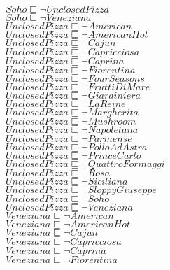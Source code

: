 \documentclass[a4paper,10pt]{article}
\begin{document}
 $Soho \sqsubseteq  \lnot UnclosedPizza$\\ 
 $Soho \sqsubseteq  \lnot Veneziana$\\ 
 $UnclosedPizza \sqsubseteq  \lnot American$\\ 
 $UnclosedPizza \sqsubseteq  \lnot AmericanHot$\\ 
 $UnclosedPizza \sqsubseteq  \lnot Cajun$\\ 
 $UnclosedPizza \sqsubseteq  \lnot Capricciosa$\\ 
 $UnclosedPizza \sqsubseteq  \lnot Caprina$\\ 
 $UnclosedPizza \sqsubseteq  \lnot Fiorentina$\\ 
 $UnclosedPizza \sqsubseteq  \lnot FourSeasons$\\ 
 $UnclosedPizza \sqsubseteq  \lnot FruttiDiMare$\\ 
 $UnclosedPizza \sqsubseteq  \lnot Giardiniera$\\ 
 $UnclosedPizza \sqsubseteq  \lnot LaReine$\\ 
 $UnclosedPizza \sqsubseteq  \lnot Margherita$\\ 
 $UnclosedPizza \sqsubseteq  \lnot Mushroom$\\ 
 $UnclosedPizza \sqsubseteq  \lnot Napoletana$\\ 
 $UnclosedPizza \sqsubseteq  \lnot Parmense$\\ 
 $UnclosedPizza \sqsubseteq  \lnot PolloAdAstra$\\ 
 $UnclosedPizza \sqsubseteq  \lnot PrinceCarlo$\\ 
 $UnclosedPizza \sqsubseteq  \lnot QuattroFormaggi$\\ 
 $UnclosedPizza \sqsubseteq  \lnot Rosa$\\ 
 $UnclosedPizza \sqsubseteq  \lnot Siciliana$\\ 
 $UnclosedPizza \sqsubseteq  \lnot SloppyGiuseppe$\\ 
 $UnclosedPizza \sqsubseteq  \lnot Soho$\\ 
 $UnclosedPizza \sqsubseteq  \lnot Veneziana$\\ 
 $Veneziana \sqsubseteq  \lnot American$\\ 
 $Veneziana \sqsubseteq  \lnot AmericanHot$\\ 
 $Veneziana \sqsubseteq  \lnot Cajun$\\ 
 $Veneziana \sqsubseteq  \lnot Capricciosa$\\ 
 $Veneziana \sqsubseteq  \lnot Caprina$\\ 
 $Veneziana \sqsubseteq  \lnot Fiorentina$\\ 
\end{document}
